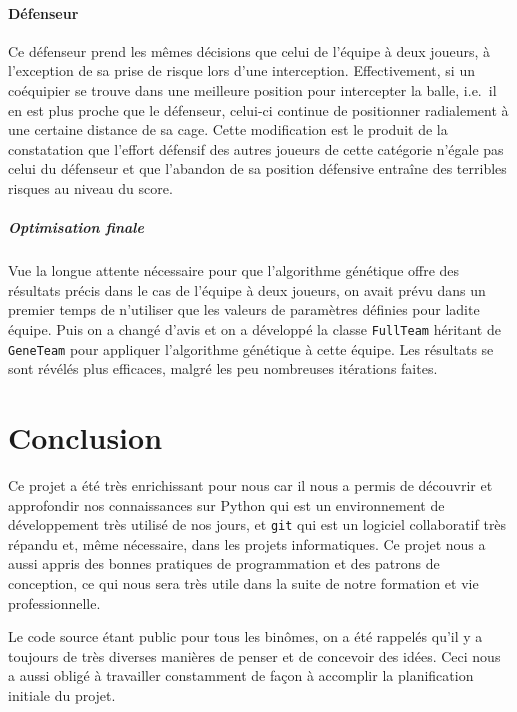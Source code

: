 \documentclass[12pt,a4paper]{article}
\begin{document}
\subsection*{D\'efenseur}
Ce d\'efenseur prend les m\^emes d\'ecisions que celui de l'\'equipe \`a 
deux joueurs, \`a l'exception de sa prise de risque lors d'une interception. 
Effectivement, si un co\'equipier se trouve dans une meilleure position pour 
intercepter la balle, i.e.\ il en est plus proche que le d\'efenseur, celui-ci 
continue de positionner radialement \`a une certaine distance de sa cage. Cette 
modification est le produit de la constatation que l'effort d\'efensif des 
autres joueurs de cette cat\'egorie n'\'egale pas celui du d\'efenseur et que 
l'abandon de sa position d\'efensive entra\^ine des terribles risques au 
niveau du score.

\subsubsection*{Optimisation finale}
Vue la longue attente n\'ecessaire pour que l'algorithme g\'en\'etique offre 
des r\'esultats pr\'ecis dans le cas de l'\'equipe \`a deux joueurs, on avait 
pr\'evu dans un premier temps de n'utiliser que les valeurs de param\`etres 
d\'efinies pour ladite \'equipe. Puis on a chang\'e d'avis et on a 
d\'evelopp\'e la classe \texttt{FullTeam} h\'eritant de \texttt{GeneTeam} pour 
appliquer l'algorithme g\'en\'etique \`a cette \'equipe. Les r\'esultats se 
sont r\'ev\'el\'es plus efficaces, malgr\'e les peu nombreuses it\'erations 
faites.

\newpage

\part*{Conclusion}
Ce projet a \'et\'e tr\`es enrichissant pour nous car il nous a permis de 
d\'ecouvrir et approfondir nos connaissances sur Python qui est un 
environnement de d\'eveloppement tr\`es utilis\'e de nos jours, et 
\texttt{git} qui est un logiciel collaboratif tr\`es r\'epandu et, m\^eme 
n\'ecessaire, dans les projets informatiques. 
Ce projet nous a aussi appris des bonnes pratiques de programmation et des 
patrons de conception, ce qui nous sera tr\`es utile dans la suite de notre 
formation et vie professionnelle.

Le code source \'etant public pour tous les bin\^omes, on a \'et\'e rappel\'es 
qu'il y a toujours de tr\`es diverses mani\`eres de penser et de concevoir des 
id\'ees. Ceci nous a aussi oblig\'e \`a travailler constamment de fa\c{c}on \`a 
accomplir la planification initiale du projet.
\end{document}
